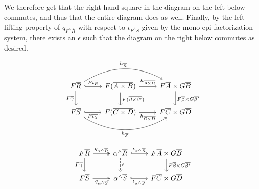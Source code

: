 \documentclass{lmcs}
\theoremstyle{plain}\newtheorem{satz}[thm]{Satz}
\begin{document}
\noindent
We therefore get that the right-hand square in the diagram on the left
below commutes, and thus that the entire diagram does as well.
Finally, by the left-lifting property of $q_{F^\wedge\overline{R}}$
with respect to $\iota_{F^\wedge\overline{S}}$ given by the mono-epi
factorization system, there exists an $\epsilon$ such that the diagram
on the right below commutes as desired.
\begin{figure*}[ht]
  \vspace*{-0.1in}
  \hspace*{-0.5in}
  \begin{minipage}[b]{0.45\linewidth}
{\footnotesize \[
      \begin{tikzcd}
          F\overline{R}
          \ar[d, "{F\overline{\gamma}}"']
          \ar[r, hookrightarrow, "{F\overline{\iota_R}}"]
          \ar[rr, bend left, "{h_{\overline{R}}}"]
          &F(\overline{A \times B})
          \ar[d, "{F(\overline{\beta \times \beta'})}"]
          \ar[r, "{h_{\overline{A \times B}}}"]
          &F\overline{A} \times G\overline{B}
          \ar[d, "{F\overline{\beta} \times G\overline{\beta'}}"] \\
          F\overline{S}
          \ar[r, hookrightarrow, "{F\overline{\iota_S}}"']
          \ar[rr, bend right, "{h_{\overline{S}}}"']
          &F(\overline{C \times D})
          \ar[r, "{h_{\overline{C \times D}}}"']
          &F\overline{C} \times G\overline{D}
      \end{tikzcd}
      \]}
\end{minipage}
  \vspace*{-0.5in}
  \begin{minipage}[b]{0.45\linewidth}
      {\footnotesize
        \[  \vspace*{0.4in}
      \begin{tikzcd}
          F\overline{R}
          \ar[d, "{F\overline{\gamma}}"']
          \ar[r, twoheadrightarrow, "{q_{\alpha^\wedge\overline{R}}}"]
          &\alpha^\wedge\overline{R}
          \ar[d, dashed, "{\epsilon}"]
          \ar[r, hookrightarrow, "{\iota_{\alpha^\wedge\overline{R}}}"]
          &F\overline{A} \times G\overline{B}
          \ar[d, "{F\overline{\beta} \times G\overline{\beta'}}"] \\
          F\overline{S}
          \ar[r, twoheadrightarrow, "{q_{\alpha^\wedge\overline{S}}}"']
          &\alpha^\wedge\overline{S}
          \ar[r, hookrightarrow, "{\iota_{\alpha^\wedge\overline{S}}}"']
          &F\overline{C} \times G\overline{D}
      \end{tikzcd}
      \]}
\end{minipage}
\end{figure*}
\end{document}
